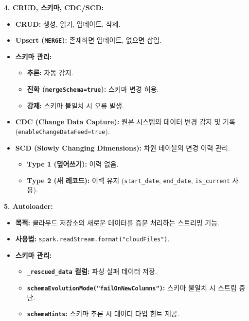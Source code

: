 \documentclass[11pt,a4paper]{article}
\theoremstyle{definition}
\begin{document}
\begin{tcolorbox}[colback=blue!5!white, colframe=blue!75!black, title=\textbf{CSCI103 Lecture 4: 데이터 변환 핵심 요약}]
\textbf{4. CRUD, 스키마, CDC/SCD:}
\begin{itemize}
    \item \textbf{CRUD:} 생성, 읽기, 업데이트, 삭제.
    \item \textbf{Upsert (\texttt{MERGE}):} 존재하면 업데이트, 없으면 삽입.
    \item \textbf{스키마 관리:}
    \begin{itemize}
        \item \textbf{추론:} 자동 감지.
        \item \textbf{진화 (\texttt{mergeSchema=true}):} 스키마 변경 허용.
        \item \textbf{강제:} 스키마 불일치 시 오류 발생.
    \end{itemize}
    \item \textbf{CDC (Change Data Capture):} 원본 시스템의 데이터 변경 감지 및 기록 (\texttt{enableChangeDataFeed=true}).
    \item \textbf{SCD (Slowly Changing Dimensions):} 차원 테이블의 변경 이력 관리.
    \begin{itemize}
        \item \textbf{Type 1 (덮어쓰기):} 이력 없음.
        \item \textbf{Type 2 (새 레코드):} 이력 유지 (\texttt{start_date}, \texttt{end_date}, \texttt{is_current} 사용).
    \end{itemize}
\end{itemize}

\textbf{5. Autoloader:}
\begin{itemize}
    \item \textbf{목적:} 클라우드 저장소의 새로운 데이터를 증분 처리하는 스트리밍 기능.
    \item \textbf{사용법:} \texttt{spark.readStream.format("cloudFiles")}.
    \item \textbf{스키마 관리:}
    \begin{itemize}
        \item \textbf{\texttt{_rescued_data} 컬럼:} 파싱 실패 데이터 저장.
        \item \textbf{\texttt{schemaEvolutionMode("failOnNewColumns")}:} 스키마 불일치 시 스트림 중단.
        \item \textbf{\texttt{schemaHints}:} 스키마 추론 시 데이터 타입 힌트 제공.
    \end{itemize}
\end{itemize}
\end{tcolorbox}
\end{document}
